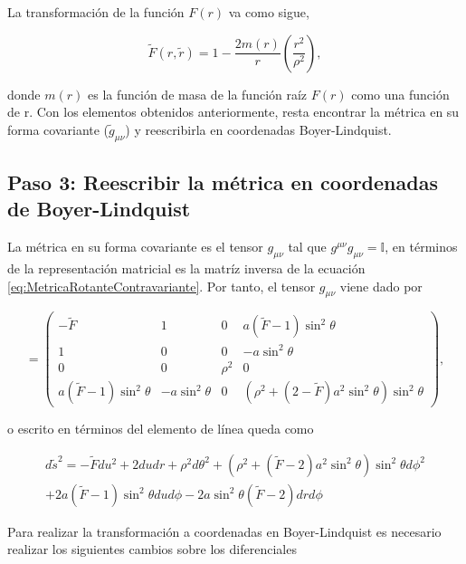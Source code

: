 La transformación de la función $F(r)$ va como sigue,

\begin{equation}
    \tilde{F}(r,\tilde{r})=1-\dfrac{2m(r)}{r}\left(\dfrac{r^2}{\rho^2}\right),
\end{equation}

donde $m(r)$ es la función de masa de la función raíz $F(r)$ como una función de r. Con los elementos obtenidos anteriormente, resta encontrar la métrica en su forma covariante ($\tilde{g}_{\mu\nu}$) y reescribirla en coordenadas Boyer-Lindquist.

\subsection{Paso 3: Reescribir la métrica en coordenadas de Boyer-Lindquist}

La métrica en su forma covariante es el tensor $g_{\mu\nu}$ tal que $g^{\mu\nu}g_{\mu\nu}=\mathbb{I}$, en términos de la representación matricial es la matríz inversa de la ecuación \eqref{eq:MetricaRotanteContravariante}. Por tanto, el tensor $g_{\mu\nu}$ viene dado por

\begin{equation}
    [g_{\mu\nu}]=\begin{pmatrix}- \tilde{F} & 1 & 0 & a \left(\tilde{F} - 1\right) \sin^{2}{\theta}\\1 & 0 & 0 & - a \sin^{2}{\theta}\\0 & 0 & \rho^{2} & 0\\a \left(\tilde{F} - 1\right) \sin^{2}{\theta} & - a \sin^{2}{\theta} & 0 & \left(\rho^{2} + (2-\tilde{F}) a^{2} \sin^{2}{\theta}\right) \sin^{2}{\theta}\end{pmatrix},
\end{equation}

o escrito en términos del elemento de línea queda como

\begin{equation}
    \begin{split}
    d\tilde{s}^2=-\tilde{F}du^2+2dudr+\rho^2d\theta^2+\left(\rho^{2} + (\tilde{F}-2) a^{2} \sin^{2}{\theta}\right) \sin^{2}{\theta}d\phi^2\\
    +2a \left(\tilde{F} - 1\right) \sin^{2}{\theta}dud\phi-2a\sin^2\theta (\tilde{F}-2) drd\phi
    \label{eq:LineElementRotating}
\end{split}
\end{equation}

Para realizar la transformación a coordenadas en Boyer-Lindquist es necesario realizar los siguientes cambios sobre los diferenciales \cite{AplicabilityOfJN}

